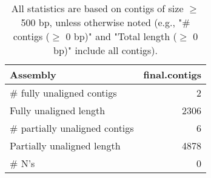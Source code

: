 \documentclass[12pt,a4paper]{article}
\begin{document}
\begin{table}[ht]
\begin{center}
\caption{All statistics are based on contigs of size $\geq$ 500 bp, unless otherwise noted (e.g., "\# contigs ($\geq$ 0 bp)" and "Total length ($\geq$ 0 bp)" include all contigs).}
\begin{tabular}{|l*{1}{|r}|}
\hline
Assembly & final.contigs \\ \hline
\# fully unaligned contigs & 2 \\ \hline
Fully unaligned length & 2306 \\ \hline
\# partially unaligned contigs & 6 \\ \hline
Partially unaligned length & 4878 \\ \hline
\# N's & 0 \\ \hline
\end{tabular}
\end{center}
\end{table}
\end{document}
